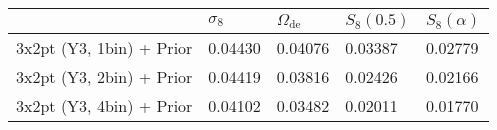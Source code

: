 \begin{tabular}{lllll}
\toprule
{} & $\sigma_8$ & $\Omega_\mathrm{de}$ & $S_8(0.5)$ & $S_8(\alpha)$ \\
\midrule
3x2pt (Y3, 1bin) + Prior &    0.04430 &              0.04076 &    0.03387 &       0.02779 \\
3x2pt (Y3, 2bin) + Prior &    0.04419 &              0.03816 &    0.02426 &       0.02166 \\
3x2pt (Y3, 4bin) + Prior &    0.04102 &              0.03482 &    0.02011 &       0.01770 \\
\bottomrule
\end{tabular}
